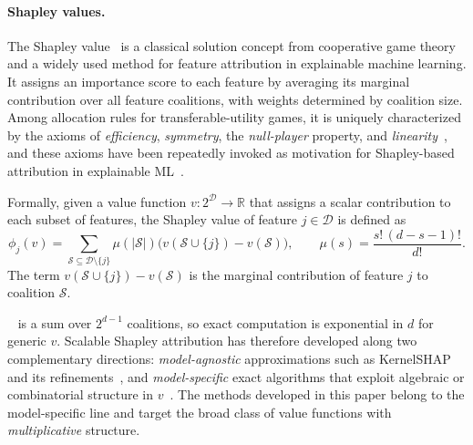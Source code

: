 \documentclass{article}
\newcommand{\cD}{\mathcal{D}}
\newcommand{\cS}{\mathcal{S}}
\begin{document}
\paragraph{Shapley values.}
The Shapley value~\citep{shapley} is a classical solution concept from cooperative game theory and a widely used method for feature attribution in explainable machine learning.
It assigns an importance score to each feature by averaging its marginal contribution over all feature coalitions, with weights determined by coalition size.
Among allocation rules for transferable-utility games, it is uniquely characterized by the axioms of \emph{efficiency}, \emph{symmetry}, the \emph{null-player} property, and \emph{linearity}~\citep{shapley,weber1988probabilistic}, and these axioms have been repeatedly invoked as motivation for Shapley-based attribution in explainable ML~\citep{shap,many_sv}.

Formally, given a value function $v : 2^{\cD} \to \mathbb{R}$ that assigns a scalar contribution to each subset of features,
the Shapley value of feature $j \in \cD$ is defined as
\begin{equation}
\label{eq:shapley_def}
\phi_j(v)
=
\sum_{\cS \subseteq \cD \setminus \{j\}}
\mu(|\cS|)
\bigl( v(\cS \cup \{j\}) - v(\cS) \bigr),
\qquad
\mu(s) = \frac{s!\,(d-s-1)!}{d!}.
\end{equation}
The term $v(\cS \cup \{j\}) - v(\cS)$ is the marginal contribution of feature $j$ to coalition $\cS$.%

~ is a sum over $2^{d-1}$ coalitions, so exact computation is exponential in $d$ for generic $v$.
Scalable Shapley attribution has therefore developed along two complementary directions: \emph{model-agnostic} approximations such as KernelSHAP and its refinements~\citep{shap,shapiq,polyshap,lime}, and \emph{model-specific} exact algorithms that exploit algebraic or combinatorial structure in $v$~\citep{treeshap,linear_treeshap,fourier_treeshap,fast_tree_shap,q-shap,pkex_shapley,fgpx_shapley,rkhs_shap,gpshap}.
The methods developed in this paper belong to the model-specific line and target the broad class of value functions with \emph{multiplicative} structure.
\end{document}
